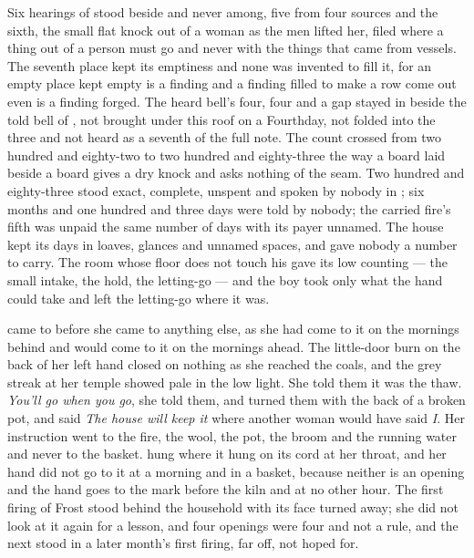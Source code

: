 Six hearings of  stood beside and never among, five from four sources and the sixth, the small flat knock out of a woman as the men lifted her, filed where a thing out of a person must go and never with the things that came from vessels. The seventh place kept its emptiness and none was invented to fill it, for an empty place kept empty is a finding and a finding filled to make a row come out even is a finding forged. The heard bell's four, four and a gap stayed in  beside the told bell of , not brought under this roof on a Fourthday, not folded into the three and not heard as a seventh of the full note. The count crossed from two hundred and eighty-two to two hundred and eighty-three the way a board laid beside a board gives a dry knock and asks nothing of the seam. Two hundred and eighty-three stood exact, complete, unspent and spoken by nobody in ; six months and one hundred and three days were told by nobody; the carried fire's fifth was unpaid the same number of days with its payer unnamed. The house kept its days in loaves, glances and unnamed spaces, and gave nobody a number to carry. The room whose floor does not touch his gave its low counting --- the small intake, the hold, the letting-go --- and the boy took only what the hand could take and left the letting-go where it was.

 came to  before she came to anything else, as she had come to it on the mornings behind and would come to it on the mornings ahead. The little-door burn on the back of her left hand closed on nothing as she reached the coals, and the grey streak at her temple showed pale in the low light. She told them it was the thaw. \emph{You'll go when you go}, she told them, and turned them with the back of a broken pot, and said \emph{The house will keep it} where another woman would have said \emph{I}. Her instruction went to the fire, the wool, the pot, the broom and the running water and never to the basket.  hung where it hung on its cord at her throat, and her hand did not go to it at a morning and in a basket, because neither is an opening and the hand goes to the mark before the kiln and at no other hour. The first firing of Frost stood behind the household with its face turned away; she did not look at it again for a lesson, and four openings were four and not a rule, and the next stood in a later month's first firing, far off, not hoped for.

